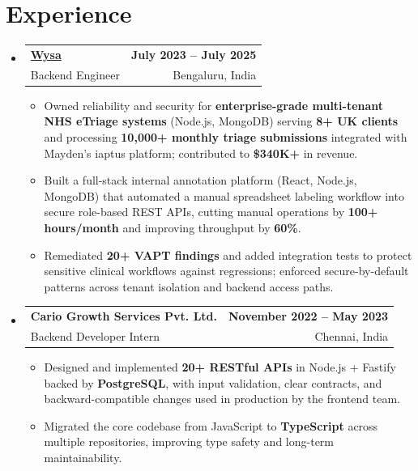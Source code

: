 \documentclass[letterpaper,10pt]{article}
\makeatletter
\newcommand{\resumeItem}[1]{
  \item\small{#1\vspace{-1pt}}
}
\newcommand{\resumeSubheading}[4]{
  \vspace{1pt}\item
    \begin{tabular*}{0.985\textwidth}[t]{l@{\extracolsep{\fill}}r}
      \textbf{#1} & \textbf{\small #2} \\
      {\small\color{ResumeSlate} #3} & {\small\color{ResumeSlate} #4} \\
    \end{tabular*}\vspace{-6pt}
}
\newcommand{\resumeSubHeadingListStart}{\begin{itemize}[leftmargin=0.0in, label={}, itemsep=2pt, topsep=2pt]}
\newcommand{\resumeSubHeadingListEnd}{\end{itemize}}
\newcommand{\resumeItemListStart}{\begin{itemize}[leftmargin=0.18in, itemsep=2pt, topsep=1pt]}
\newcommand{\resumeItemListEnd}{\end{itemize}\vspace{-4pt}}
\makeatother
\begin{document}
\section{Experience}
\resumeSubHeadingListStart
  \resumeSubheading
    {\href{https://www.wysa.io}{Wysa}}{July 2023 -- July 2025}
    {Backend Engineer}{Bengaluru, India}
    \resumeItemListStart
      \resumeItem{Owned reliability and security for \textbf{enterprise-grade multi-tenant NHS eTriage systems} (Node.js, MongoDB) serving \textbf{8+ UK clients} and processing \textbf{10{,}000+ monthly triage submissions} integrated with Mayden's iaptus platform; contributed to \textbf{\$340K+} in revenue.}
      \resumeItem{Built a full-stack internal annotation platform (React, Node.js, MongoDB) that automated a manual spreadsheet labeling workflow into secure role-based REST APIs, cutting manual operations by \textbf{100+ hours/month} and improving throughput by \textbf{60\%}.}
      \resumeItem{Remediated \textbf{20+ VAPT findings} and added integration tests to protect sensitive clinical workflows against regressions; enforced secure-by-default patterns across tenant isolation and backend access paths.}
    \resumeItemListEnd
  \resumeSubheading
    {Cario Growth Services Pvt. Ltd.}{November 2022 -- May 2023}
    {Backend Developer Intern}{Chennai, India}
    \resumeItemListStart
      \resumeItem{Designed and implemented \textbf{20+ RESTful APIs} in Node.js + Fastify backed by \textbf{PostgreSQL}, with input validation, clear contracts, and backward-compatible changes used in production by the frontend team.}
      \resumeItem{Migrated the core codebase from JavaScript to \textbf{TypeScript} across multiple repositories, improving type safety and long-term maintainability.}
    \resumeItemListEnd
\resumeSubHeadingListEnd
\vspace{-4pt}
\end{document}
